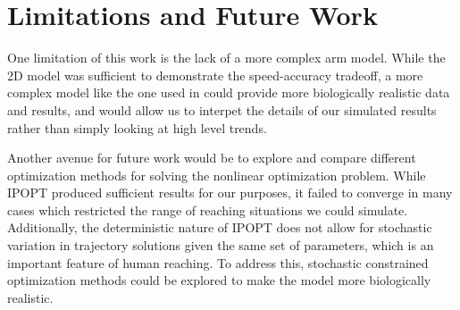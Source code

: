 \documentclass[letterpaper, 10pt, conference]{ieeeconf}
\newcommand{\todo}[1]{\textcolor{red}{\textbf{TODO:} #1}}
\begin{document}
\section{Limitations and Future Work}

One limitation of this work is the lack of a more complex arm model. While the 2D model was sufficient to demonstrate the speed-accuracy tradeoff, a more complex model like the one used in \cite{original_paper_high_fidelity} could provide more biologically realistic data and results, and would allow us to interpet the details of our simulated results rather than simply looking at high level trends.

Another avenue for future work would be to explore and compare different optimization methods for solving the nonlinear optimization problem. While IPOPT produced sufficient results for our purposes, it failed to converge in many cases which restricted the range of reaching situations we could simulate. Additionally, the deterministic nature of IPOPT does not allow for stochastic variation in trajectory solutions given the same set of parameters, which is an important feature of human reaching. To address this, stochastic constrained optimization methods could be explored to make the model more biologically realistic.
\end{document}
